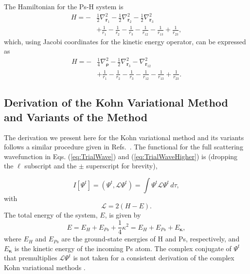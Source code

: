 \documentclass[preprint,showpacs,showkeys,preprintnumbers,amsmath,amssymb,longbibliography,pra,aps]{revtex4-1}
\begin{document}
{%
The Hamiltonian for the Ps-H system is
\begin{align}
H = -&\frac{1}{2} \nabla_{\bm{r}_1}^2 - \frac{1}{2} \nabla_{\bm{r}_2}^2 - \frac{1}{2}
  \nabla_{\bm{r}_3}^2  \nonumber \\
&+ \frac{1}{r_1} - \frac{1}{r_2} - \frac{1}{r_3} - \frac{1}{r_{12}} -
  \frac{1}{r_{13}}+\frac {1}{r_{23}},
\label{eq:Hamiltonian1}
\end{align}
which, using Jacobi coordinates for the kinetic energy operator, can be
expressed as
\begin{align}
H = -&\frac{1}{4} \nabla_{\bm{\rho}}^2 - \frac{1}{2} \nabla_{\bm{r}_3}^2 -
  \nabla_{\bm{r}_{12}}^2  \nonumber \\
&+ \frac{1}{r_1} - \frac{1}{r_2} - \frac{1}{r_3} - \frac{1}{r_{12}} -
  \frac{1}{r_{13}}+\frac{1}{r_{23}}.
\label{eq:Hamiltonian2}
\end{align}


\subsection{Derivation of the Kohn Variational Method and Variants of the Method}
\label{sec:Kohn}
The derivation we present here for the Kohn variational method and its variants
follows a similar procedure given in
Refs.~\cite{Lucchese1989,Cooper2010,Armour1991,VanReethThesis}.
The functional for the full scattering wavefunction in Eqs. (\ref{eq:TrialWave}) and
(\ref{eq:TrialWaveHigher}) is (dropping the $\ell$ subscript and the $\pm$ 
superscript for brevity),

\begin{equation}
I[\Psi^t] = \left(\Psi^t, \mathcal{L} \Psi^t \right) = \int \Psi^t \mathcal{L}
  \Psi^t \,d\tau,
\label{eq:IlDefPsi}
\end{equation}
with
\begin{equation}
\mathcal{L} = 2(H - E).
\label{eq:LDef}
\end{equation}
The total energy of the system, $E$, is given by
\begin{equation}
\label{eq:TotalEnergy}
E = E_H + E_{Ps} + \frac{1}{4}\kappa^2 = E_H + E_{Ps} + E_{\bm \kappa},
\end{equation}
where $E_H$ and $E_{Ps}$ are the ground-state energies of H and Ps, 
respectively,
and $E_{\bm \kappa}$ is the kinetic energy of the incoming Ps atom.
The complex conjugate of $\Psi^t$ that premultiplies $\mathcal{L} \Psi^t$
is not taken for a consistent derivation of the complex Kohn variational
methods \cite{Cooper2010,Lucchese1989}.

}
\end{document}
